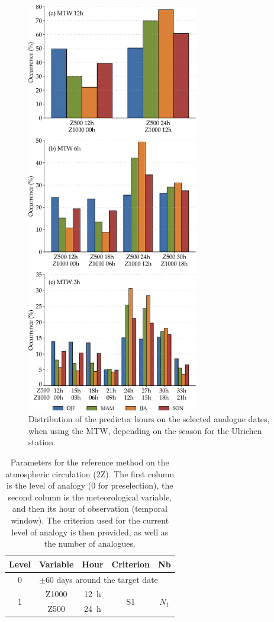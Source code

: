 \documentclass[hess, manuscript]{copernicus}
\begin{document}
	\begin{figure}[htb]
		\includegraphics[width=7.5cm]{fig11.pdf}
		\caption{Distribution of the predictor hours on the selected analogue dates, when using the MTW, depending on the season for the Ulrichen station.}
		\label{fig:hours_selection_per_season}
	\end{figure}
	
	
	\clearpage
	
	
	\begin{table}[htb]
		\caption{Parameters for the reference method on the atmospheric circulation (2Z). The first column is the level of analogy (0 for preselection), the second column is the meteorological variable, and then its hour of observation (temporal window). The criterion used for the current level of analogy is then provided, as well as the number of analogues.}
		\footnotesize
		\begin{center}
			\begin{tabular}{ccccc}
				\hline
				Level & Variable & Hour & Criterion & Nb \\ 
				\hline 
				0 & \multicolumn{4}{l}{$\pm 60$ days around the target date} \\
				\hline 
				\multirow{2}{*}{1} & Z1000 & 12~h & \multirow{2}{*}{S1} & \multirow{2}{*}{$N_{1}$} \\
				& Z500 & 24~h & & \\ 
				\hline 
			\end{tabular} 
		\end{center}
		\label{table:method_2Z}
	\end{table}
	
\end{document}
